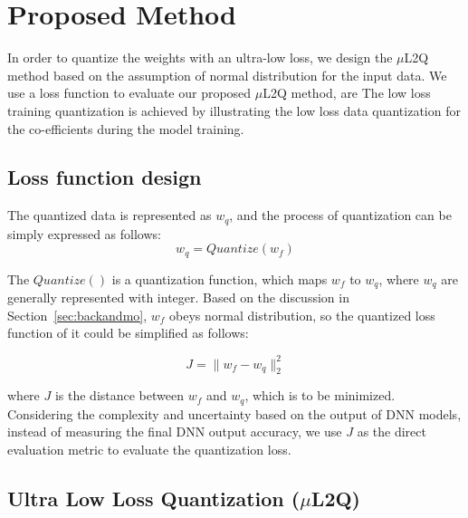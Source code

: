 \section{Proposed Method}\label{sec:ulq}

In order to quantize the weights with an ultra-low loss, we design the $\mu$L2Q method based on the assumption of normal distribution for the input data. 
We use a loss function to evaluate our proposed $\mu$L2Q method, are The low loss training quantization is achieved by illustrating the low loss data quantization for the co-efficients during the model training. 

\subsection{Loss function design}
The quantized data is represented as $w_q$, and the process of quantization can be simply expressed as follows:
\begin{equation}
    w_q=Quantize(w_f)
\end{equation}

The $Quantize()$ is a quantization function, which maps $w_f$ to $w_q$, where $w_q$ are generally represented with integer. 
Based on the discussion in Section~\ref{sec:backandmo}, $w_f$ obeys normal distribution, so the quantized loss function of it could be simplified as follows:

\vspace{-2mm}
\begin{equation}
\label{eqn:loss_func}
    J=\lVert w_f-w_q \rVert_2^2
\end{equation}

where $J$ is the distance between $w_f$ and $w_q$, which is to be minimized.
Considering the complexity and uncertainty based on the output of DNN models, instead of measuring the final DNN output accuracy, we use $J$ as the direct evaluation metric to evaluate the quantization loss.

\subsection{Ultra Low Loss Quantization ($\mu$L2Q)}

